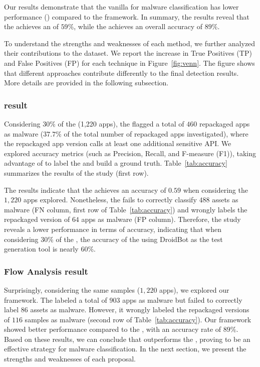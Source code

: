 Our results demonstrate that the vanilla \mas for malware classification has lower performance (\fone) compared to the \droidxpflow framework. In summary, the results reveal that the \mas achieves an \fone of $59\%$, while the \droidxpflow achieves an overall accuracy of $89\%$.

To understand the strengths and weaknesses of each method, we further analyzed their contributions to the \fds dataset. We report the increase in True Positives (TP) and False Positives (FP) for each technique in Figure~\ref{fig:venn}. The figure shows that different approaches contribute differently to the final detection results. More details are provided in the following subsection.


\subsubsection{\mas result} 

Considering $30\%$ of the \fds (1,220 apps), the \mas flagged a total of $460$ repackaged apps as malware ($37.7\%$ of the total number of repackaged apps investigated), where the repackaged app version calls at least one additional sensitive API. We explored accuracy metrics (such as Precision, Recall, and F-measure (F1)), taking advantage of \vt to label the \fds and build a ground truth. Table~\ref{tab:accuracy} summarizes the results of the study (first row).

The results indicate that the \mas achieves an accuracy of $0.59$ when considering the $1,220$ apps explored. Nonetheless, the \mas fails to correctly classify $488$ assets as malware (FN column, first row of Table~\ref{tab:accuracy}) and wrongly labels the repackaged version of $64$ apps as malware (FP column). Therefore, the study reveals a lower performance in terms of accuracy, indicating that when considering $30\%$ of the \fds, the accuracy of the \mas using DroidBot as the test generation tool is nearly $60\%$.


\subsubsection{Flow Analysis result} 

Surprisingly, considering the same samples ($1,220$ apps), we explored our framework. The \droidxpflow labeled a total of $903$ apps as malware but failed to correctly label $86$ assets as malware. However, it wrongly labeled the repackaged versions of $116$ samples as malware (second row of Table~\ref{tab:accuracy}). Our \droidxpflow framework showed better performance compared to the \mas, with an accuracy rate of $89\%$. Based on these results, we can conclude that \droidxpflow outperforms the \mas, proving to be an effective strategy for malware classification. In the next section, we present the strengths and weaknesses of each proposal.


